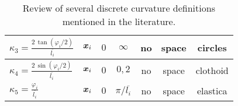 {\begin{table}[h!]
\begin{tabular}{l | c c c c c c}
 		$\kappa_3 = \frac{2\, \tan(\varphi_i / 2)}{\overbar{l_i}} $				&  $\boldsymbol{x}_i$	&  $0$ 				&  $\infty$					&  no		&  space	&  circles			\\[5pt]
	\hline
		$\kappa_4 = \frac{2\,\sin(\varphi_i / 2)}{\overbar{l_i}}$ 				&  $\boldsymbol{x}_i$	&  $0$				&  $0, 2$					&  no		&  space	&  clothoid  		\\
		$\kappa_5 = \frac{\varphi_i}{\overbar{l_i}}$ 						&  $\boldsymbol{x}_i$	&  $0$				&  $\pi/\overbar{l_i}$			&  no		&  space	&  elastica  		\\[5pt]
		\hline
		\end{tabular}
		\caption{Review of several discrete curvature definitions mentioned in the literature.}
	\label{tab:kb_def}
   \end{table}
} %


%
%
%
%
%
%
%

